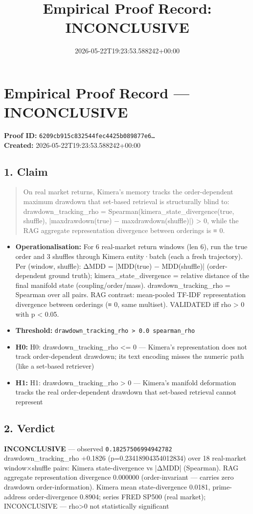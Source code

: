 \documentclass{article}
\title{Empirical Proof Record: INCONCLUSIVE}
\date{2026-05-22T19:23:53.588242+00:00}
\begin{document}
\maketitle
\section*{Empirical Proof Record --- \textcolor{inconclusive}{\textbf{INCONCLUSIVE}}}
\textbf{Proof ID:} \texttt{6209cb915c832544fec4425b089877e6\dots}\\
\textbf{Created:} 2026-05-22T19:23:53.588242+00:00
\subsection*{1. Claim}
\begin{quote}On real market returns, Kimera's memory tracks the order-dependent maximum drawdown that set-based retrieval is structurally blind to: drawdown\_tracking\_rho = Spearman(kimera\_state\_divergence(true, shuffle), |maxdrawdown(true) − maxdrawdown(shuffle)|) > 0, while the RAG aggregate representation divergence between orderings is ≡ 0.\end{quote}
\begin{itemize}
\item \textbf{Operationalisation:} For 6 real-market return windows (len 6), run the true order and 3 shuffles through Kimera entity·batch (each a fresh trajectory). Per (window, shuffle): ΔMDD = |MDD(true) − MDD(shuffle)| (order-dependent ground truth); kimera\_state\_divergence = relative distance of the final manifold state (coupling/order/mass). drawdown\_tracking\_rho = Spearman over all pairs. RAG contrast: mean-pooled TF-IDF representation divergence between orderings (≡ 0, same multiset). VALIDATED iff rho > 0 with p < 0.05.
\item \textbf{Threshold:} \texttt{drawdown\_tracking\_rho > 0.0 spearman\_rho}
\item \textbf{H0:} H0: drawdown\_tracking\_rho <= 0 — Kimera's representation does not track order-dependent drawdown; its text encoding misses the numeric path (like a set-based retriever)
\item \textbf{H1:} H1: drawdown\_tracking\_rho > 0 — Kimera's manifold deformation tracks the real order-dependent drawdown that set-based retrieval cannot represent
\end{itemize}
\subsection*{2. Verdict}
\textcolor{inconclusive}{\textbf{INCONCLUSIVE}} --- observed \texttt{0.18257506994942782}\\
drawdown\_tracking\_rho +0.1826 (p=0.23418904354012834) over 18 real-market window×shuffle pairs: Kimera state-divergence vs |ΔMDD| (Spearman). RAG aggregate representation divergence 0.000000 (order-invariant — carries zero drawdown order-information). Kimera mean state-divergence 0.0181, prime-address order-divergence 0.8904; series FRED SP500 (real market); INCONCLUSIVE — rho>0 not statistically significant
\end{document}
